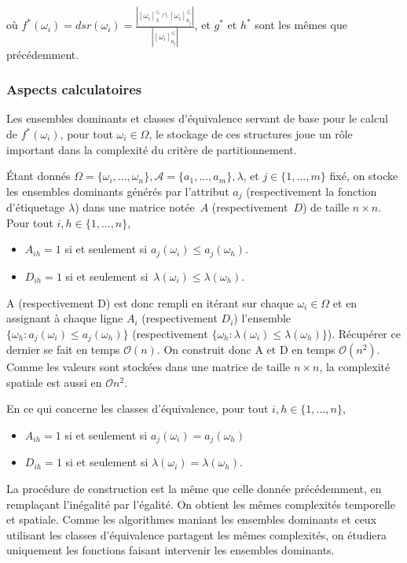 \documentclass[a4paper]{article}
\begin{document}
où $f^*(\omega_i) = dsr(\omega_i) = \frac{|[\omega_i]^{\leq}_{\lambda} \cap
[\omega_i]^{\leq}_{a_j}|}{|[\omega_i]^{\leq}_{a_j}|}$, et $g^*$ et $h^*$ sont
les mêmes que précédemment. \\

\subsubsection{Aspects calculatoires}

Les ensembles dominants et classes d'équivalence servant de base pour le calcul
de $f^*(\omega_i)$, pour tout $\omega_i \in \Omega$, le stockage de ces
structures joue un rôle important dans la complexité du critère de
partitionnement.

Étant donnés $\Omega = \{\omega_i, ... , \omega_n\}, \mathcal{A} = \{a_1, ...,
a_m\}, \lambda$, et $j \in \{1, ..., m\}$ fixé, on stocke les ensembles
dominants générés par l'attribut $a_j$ (respectivement la fonction d'étiquetage $\lambda$) dans une matrice notée~$A$ (respectivement~$D$) de taille $n \times n$. Pour tout $i,
h \in \{1,...,n\}$,
\begin{itemize} 
    \item $A_{ih} = 1$ si et seulement si $a_j(\omega_i) \leq
    a_j(\omega_h)$.
    \item $D_{ih}= 1$ si et seulement si~$\lambda(\omega_i) \leq \lambda(\omega_h)$.
\end{itemize}
A (respectivement D) est donc rempli en itérant sur chaque $\omega_i \in \Omega$
et en assignant à chaque ligne $A_i$ (respectivement $D_i$) l'ensemble
$\{\omega_h : a_j(\omega_i) \leq a_j(\omega_h)\}$ (respectivement $\{\omega_h :
\lambda(\omega_i) \leq \lambda(\omega_h)\}$). Récupérer ce dernier se fait en
temps $\mathcal{O}(n)$. On construit donc A et D en temps $\mathcal{O}(n^2)$.
Comme les valeurs sont stockées dans une matrice de taille $n \times n$, la
complexité spatiale est aussi en $\mathcal{O}{n^2}$.

En ce qui concerne les classes d'équivalence, pour tout $i, h \in \{1,...,n\}$,
\begin{itemize}
    \item $A_{ih} = 1$ si et seulement si $a_j(\omega_i) = a_j(\omega_h)$
    \item $D_{ih} = 1$ si et seulement si $\lambda(\omega_i) = \lambda(\omega_h)$. 
\end{itemize}
La procédure de construction est la même que celle donnée
précédemment, en remplaçant l'inégalité par l'égalité. On obtient les mêmes
complexités temporelle et spatiale. Comme les algorithmes maniant les ensembles
dominants et ceux utilisant les classes d'équivalence partagent les mêmes
complexités, on étudiera uniquement les fonctions faisant intervenir les
ensembles dominants. 
\end{document}
